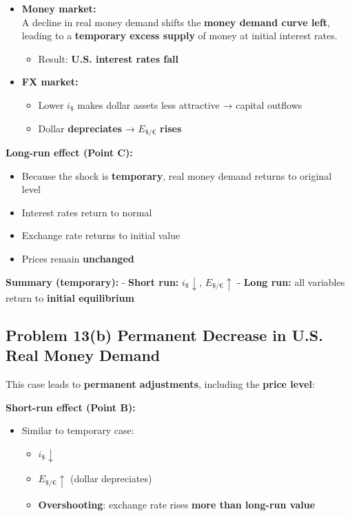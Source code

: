 \documentclass[
]{article}
\providecommand{\tightlist}{%
  \setlength{\itemsep}{0pt}\setlength{\parskip}{0pt}}
\begin{document}
\begin{itemize}
\tightlist
\item
  \textbf{Money market:}\\
  A decline in real money demand shifts the \textbf{money demand curve
  left}, leading to a \textbf{temporary excess supply} of money at
  initial interest rates.

  \begin{itemize}
  \tightlist
  \item
    Result: \textbf{U.S. interest rates fall}
  \end{itemize}
\item
  \textbf{FX market:}

  \begin{itemize}
  \tightlist
  \item
    Lower \(i_{\$}\) makes dollar assets less attractive → capital
    outflows
  \item
    Dollar \textbf{depreciates} → \(E_{\$/€}\) \textbf{rises}
  \end{itemize}
\end{itemize}

\textbf{Long-run effect (Point C):}

\begin{itemize}
\tightlist
\item
  Because the shock is \textbf{temporary}, real money demand returns to
  original level
\item
  Interest rates return to normal
\item
  Exchange rate returns to initial value
\item
  Prices remain \textbf{unchanged}
\end{itemize}

\textbf{Summary (temporary):} - \textbf{Short run:}
\(i_{\$} \downarrow\), \(E_{\$/€} \uparrow\) - \textbf{Long run:} all
variables return to \textbf{initial equilibrium}

\subsection{Problem 13(b) Permanent Decrease in U.S. Real Money
Demand}\label{problem-13b-permanent-decrease-in-u.s.-real-money-demand}

This case leads to \textbf{permanent adjustments}, including the
\textbf{price level}:

\textbf{Short-run effect (Point B):}

\begin{itemize}
\tightlist
\item
  Similar to temporary case:

  \begin{itemize}
  \tightlist
  \item
    \(i_{\$} \downarrow\)
  \item
    \(E_{\$/€} \uparrow\) (dollar depreciates)
  \item
    \textbf{Overshooting}: exchange rate rises \textbf{more than
    long-run value}
  \end{itemize}
\end{itemize}
\end{document}
